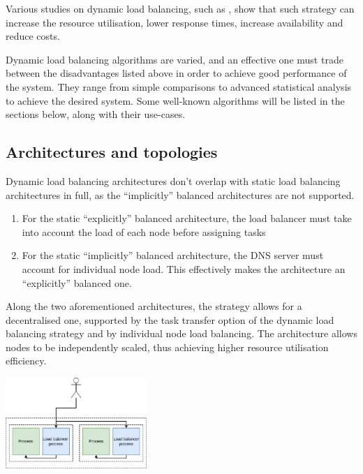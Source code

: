 \documentclass[conference]{IEEEtran}
\begin{document}
    Various studies on dynamic load balancing, such as \cite{b2}, show that such strategy can increase the resource utilisation,
lower response times, increase availability and reduce costs. 

    Dynamic load balancing algorithms are varied, and an effective one must trade between the disadvantages listed above in
order to achieve good performance of the system. They range from simple comparisons to advanced statistical analysis to achieve
the desired system. Some well-known algorithms will be listed in the sections below, along with their use-cases.

\subsection{Architectures and topologies}
    Dynamic load balancing architectures don't overlap with static load balancing architectures in full, as the ``implicitly''
balanced architectures are not supported.
    
    \begin{enumerate}
        \item For the static ``explicitly'' balanced architecture, the load balancer must take into account the load of each node before assigning tasks
        \item For the static ``implicitly'' balanced architecture, the DNS server must account for individual node load. This effectively makes the
        architecture an ``explicitly'' balanced one.
    \end{enumerate}

    Along the two aforementioned architectures, the strategy allows for a decentralised one, supported by the task transfer
option of the dynamic load balancing strategy and by individual node load balancing. The architecture allows nodes to be independently scaled,
thus achieving higher resource utilisation efficiency.

    \begin{center}
        \vspace{1em}
        \includegraphics[width=0.4\textwidth]{internally-load-balanced-node.png}
         \label{internally-load-balanced-node}
        \vspace{1em}
    \end{center}
\end{document}
